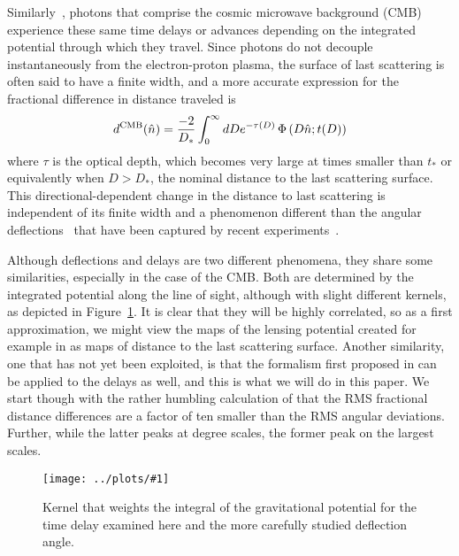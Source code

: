 \documentclass[prl,amsmath,amssymb,floatfix,superscriptaddress,nofootinbib,twocolumn]{revtex4-1}
\def\be{\begin{equation}}
\def\ee{\end{equation}}
\newcommand{\sfig}[2]{
\texttt{[image: ../plots/\#1]}
        }
\newcommand{\Sfig}[2]{
   \begin{figure}[thbp]
   \begin{center}
    \sfig{#1.pdf}{0.9\columnwidth}
    \caption{{\small #2}}
    \label{fig:#1}
     \end{center}
   \end{figure}
}
\newcommand{\rf}[1]{\ref{fig:#1}}
\begin{document}
Similarly~\cite{Hu:2001yq}, photons that comprise the cosmic microwave background (CMB) experience these same time delays or advances depending on the integrated potential through which they travel. Since photons do not decouple instantaneously from the electron-proton plasma, the surface of last scattering is often said to have a finite width, and a more accurate expression for the fractional difference in distance traveled is
\be
d^{\rm CMB}(\hat n) = \frac{-2}{D_*} \int_0^\infty dD e^{-\tau(D)}\, \Phi\left(D\hat n; t(D)\right)
\ee
where $\tau$ is the optical depth, which becomes very large at times smaller than $t_*$ or equivalently when $D>D_*$, the nominal distance to the last scattering surface. This directional-dependent change in the distance to last scattering is independent of its finite width and a phenomenon different than the angular deflections~\cite{Hu:2001tn,Lewis:2006fu} that have been captured by recent experiments~\cite{Smith:2007rg,Ade:2013tyw,Story:2014hni,Sherwin:2016tyf,Aghanim:2018oex}.

Although deflections and delays are two different phenomena, they share some similarities, especially in the case of the CMB. Both are determined by the integrated potential along the line of sight, although with slight different kernels, as depicted in Figure~\rf{kernel}. It is clear that they will be highly correlated, so as a first approximation, we might view the maps of the lensing potential created for example in \citet{Aghanim:2018oex} as maps of distance to the last scattering surface. Another similarity, one that has not yet been exploited, is that the formalism first proposed in \citet{Hu:2001tn} can be applied to the delays as well, and this is what we will do in this paper. We start though with the rather humbling calculation of \cite{Hu:2001yq} that the RMS fractional distance differences are a factor of ten smaller than the RMS angular deviations. Further, while the latter peaks at degree scales, the former peak on the largest scales.

\Sfig{kernel}{Kernel that weights the integral of the gravitational potential for the time delay examined here and the more carefully studied deflection angle.}
\end{document}
